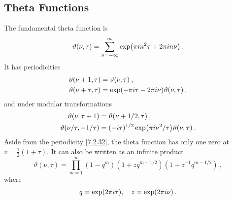 \subsection*{Theta Functions} 
The fundamental theta function is 
\begin{equation}
	\vartheta(\nu, \tau)=\sum_{n=-\infty}^{\infty} \exp (\pi i n^{2} \tau+2 \pi i n \nu) \:. \label{7.2.31} 
\end{equation}
It has periodicities 
\begin{subequations}  \label{7.2.32}
	\begin{align}
		\vartheta(\nu+1, \tau) &= \vartheta(\nu, \tau) \:, \label{7.2.32a}  \\
		\vartheta(\nu+\tau, \tau) &= \exp (-\pi i \tau-2 \pi i \nu) \vartheta(\nu, \tau) \:, \label{7.2.32b} 
	\end{align}
\end{subequations}
and under modular transformations 
\begin{subequations} \label{7.2.33}
	\begin{align}
		\vartheta(\nu, \tau+1) &= \vartheta(\nu + 1/2, \tau) \:, \label{7.2.33a} \\
		\vartheta(\nu/\tau, -1/\tau) &=(-i \tau)^{1 / 2} \exp (\pi i \nu^{2} / \tau) \vartheta(\nu, \tau) \:. \label{7.2.33b} 
	\end{align}
\end{subequations}
Aside from the periodicity \eqref{7.2.32}, the theta function has only one zero at $v=\frac{1}{2}(1+\tau)$. It can also be written as an infinite product 
\begin{equation}
	\vartheta(\nu, \tau)=\prod_{m=1}^{\infty}(1-q^{m})(1+z q^{m-1 / 2})(1+z^{-1} q^{m-1 / 2}) \:, \label{7.2.34} 
\end{equation}
where 
\begin{equation}
	q=\exp (2 \pi i \tau), \quad z=\exp (2 \pi i\nu) \:. \label{7.2.35} 
\end{equation}


